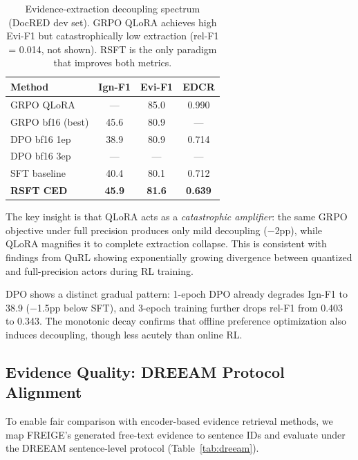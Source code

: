 \documentclass[11pt,a4paper]{article}
\begin{document}
\begin{table}[t]
\centering
\small
\begin{tabular}{lccc}
\toprule
\textbf{Method} & \textbf{Ign-F1} & \textbf{Evi-F1} & \textbf{EDCR} \\
\midrule
GRPO QLoRA & --- & 85.0 & 0.990 \\
GRPO bf16 (best) & 45.6 & 80.9 & --- \\
DPO bf16 1ep & 38.9 & 80.9 & 0.714 \\
DPO bf16 3ep & --- & --- & --- \\
\midrule
SFT baseline & 40.4 & 80.1 & 0.712 \\
\textbf{RSFT CED} & \textbf{45.9} & \textbf{81.6} & \textbf{0.639} \\
\bottomrule
\end{tabular}
\caption{Evidence-extraction decoupling spectrum (DocRED dev set). GRPO QLoRA achieves high Evi-F1 but catastrophically low extraction (rel-F1 = 0.014, not shown). RSFT is the only paradigm that improves both metrics.}
\label{tab:spectrum}
\end{table}

The key insight is that QLoRA acts as a \emph{catastrophic amplifier}: the same GRPO objective under full precision produces only mild decoupling ($-$2pp), while QLoRA magnifies it to complete extraction collapse.
This is consistent with findings from QuRL showing exponentially growing divergence between quantized and full-precision actors during RL training.

DPO shows a distinct gradual pattern: 1-epoch DPO already degrades Ign-F1 to 38.9 ($-$1.5pp below SFT), and 3-epoch training further drops rel-F1 from 0.403 to 0.343.
The monotonic decay confirms that offline preference optimization also induces decoupling, though less acutely than online RL.

\subsection{Evidence Quality: DREEAM Protocol Alignment}
\label{sec:dreeam}

To enable fair comparison with encoder-based evidence retrieval methods, we map FREIGE's generated free-text evidence to sentence IDs and evaluate under the DREEAM sentence-level protocol (Table~\ref{tab:dreeam}).
\end{document}

